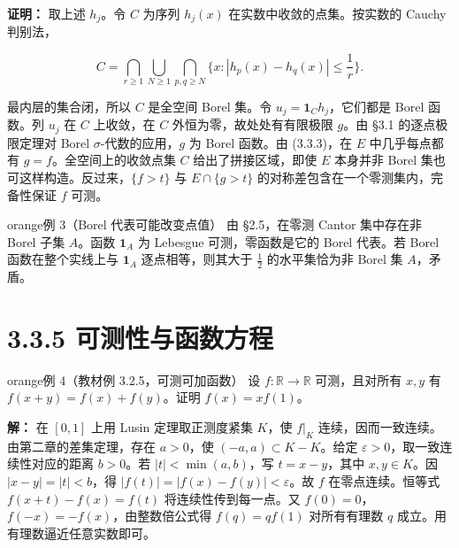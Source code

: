\documentclass[11pt,a4paper]{article}
\begin{document}
\textbf{证明：} 取上述 \(h_j\)。令 \(C\) 为序列 \(h_j(x)\)
在实数中收敛的点集。按实数的 Cauchy 判别法，

\begin{equation*}
C=\bigcap_{r\ge1}\bigcup_{N\ge1}
\bigcap_{p,q\ge N}\{x:|h_p(x)-h_q(x)|\le \frac{1}{r}\}.
\tag{3.3.4}
\end{equation*}

最内层的集合闭，所以 \(C\) 是全空间 Borel 集。令
\(u_j=\mathbf1_C h_j\)，它们都是 Borel 函数。列 \(u_j\) 在 \(C\)
上收敛，在 \(C\) 外恒为零，故处处有有限极限 \(g\)。由 §3.1
的逐点极限定理对 Borel \(\sigma\)-代数的应用，\(g\) 为 Borel 函数。由
(3.3.3)，在 \(E\) 中几乎每点都有 \(g=f\)。全空间上的收敛点集 \(C\)
给出了拼接区域，即使 \(E\) 本身并非 Borel
集也可这样构造。反过来，\(\{f>t\}\) 与 \(E\cap\{g>t\}\)
的对称差包含在一个零测集内，完备性保证 \(f\) 可测。

\begin{sboxenv}{orange}{例 3（Borel 代表可能改变点值）}
由 §2.5，在零测 Cantor 集中存在非 Borel 子集 \(A\)。函数 \(\mathbf1_A\)
为 Lebesgue 可测，零函数是它的 Borel 代表。若 Borel 函数在整个实线上与
\(\mathbf1_A\) 逐点相等，则其大于 \(\frac{1}{2}\) 的水平集恰为非 Borel
集 \(A\)，矛盾。

\end{sboxenv}

\clearpage\section[\S{}3.3.5
可测性与函数方程]{3.3.5
可测性与函数方程}\label{ux53efux6d4bux6027ux4e0eux51fdux6570ux65b9ux7a0b}

\begin{sboxenv}{orange}{例 4（教材例 3.2.5，可测可加函数）}
设 \(f:\mathbb R\to\mathbb R\) 可测，且对所有 \(x,y\) 有
\(f(x+y)=f(x)+f(y)\)。证明 \(f(x)=xf(1)\)。

\end{sboxenv}

\textbf{解：} 在 \([0,1]\) 上用 Lusin 定理取正测度紧集 \(K\)，使
\(f|_K\) 连续，因而一致连续。由第二章的差集定理，存在 \(a>0\)，使
\((-a,a)\subset K-K\)。给定 \(\varepsilon>0\)，取一致连续性对应的距离
\(b>0\)。若 \(|t|<\min(a,b)\)，写 \(t=x-y\)，其中 \(x,y\in K\)。因
\(|x-y|=|t|<b\)，得 \(|f(t)|=|f(x)-f(y)|<\varepsilon\)。故 \(f\)
在零点连续。恒等式 \(f(x+t)-f(x)=f(t)\) 将连续性传到每一点。又
\(f(0)=0\)，\(f(-x)=-f(x)\)，由整数倍公式得 \(f(q)=qf(1)\) 对所有有理数
\(q\) 成立。用有理数逼近任意实数即可。
\end{document}
